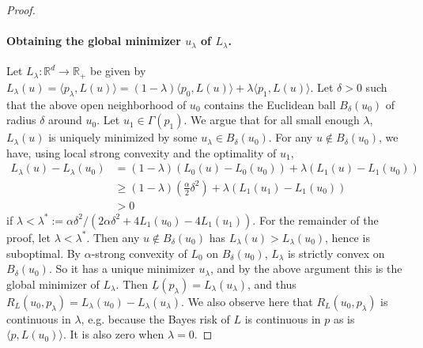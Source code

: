 \documentclass{article}
\theoremstyle{definition}\newtheorem{definition}{Definition}
\theoremstyle{definition}\newtheorem{assumption}{Assumption}
\newcommand{\reals}{\mathbb{R}}
\newcommand{\risk}[1]{\underline{#1}}
\newcommand{\inprod}[2]{\langle #1, #2 \rangle}%
\begin{document}
\begin{proof}
  \paragraph{Obtaining the global minimizer $u_{\lambda}$ of $L_{\lambda}$.}
  Let $L_\lambda:\reals^d\to\reals_+$ be given by $L_\lambda(u) = \inprod{p_\lambda}{L(u)} = (1-\lambda) \inprod{p_0}{L(u)} + \lambda \inprod{p_1}{L(u)}$.
  Let $\delta >0$ such that the above open neighborhood of $u_0$ contains the Euclidean ball $B_\delta(u_0)$ of radius $\delta$ around $u_0$.
  Let $u_1 \in \Gamma(p_1)$.
  We argue that for all small enough $\lambda$, $L_{\lambda}(u)$ is uniquely minimized by some $u_{\lambda} \in B_{\delta}(u_0)$.
  For any $u\notin B_\delta(u_0)$, we have, using local strong convexity and the optimality of $u_1$,
  \begin{align*}
    L_\lambda(u) - L_\lambda(u_0)
    &=
      (1-\lambda) \left( L_0(u) - L_0(u_0) \right)
      + \lambda \left( L_1(u) - L_1(u_0) \right)
    \\
    &\geq
      (1-\lambda) \left( \frac \alpha 2 \delta^2 \right)
      + \lambda \left( L_1(u_1) - L_1(u_0) \right)~  \\
    &> 0
  \end{align*}
  if $\lambda < \lambda^* := \alpha \delta^2 / (2 \alpha \delta^2 + 4 L_1(u_0) - 4 L_1(u_1))$.
  For the remainder of the proof, let $\lambda < \lambda^*$.
  Then any $u\notin B_{\delta}(u_0)$ has $L_{\lambda}(u) > L_{\lambda}(u_0)$, hence is suboptimal.
  By $\alpha$-strong convexity of $L_0$ on $B_\delta(u_0)$, $L_\lambda$ is strictly convex on $B_\delta(u_0)$.
  So it has a unique minimizer $u_{\lambda}$, and by the above argument this is the global minimizer of $L_{\lambda}$.
  Then $\risk{L}(p_\lambda) = L_\lambda(u_\lambda)$, and thus $R_L(u_0,p_\lambda) = L_\lambda(u_0) - L_\lambda(u_\lambda)$.
  We also observe here that $R_L(u_0,p_{\lambda})$ is continuous in $\lambda$, e.g. because the Bayes risk of $L$ is continuous in $p$ as is $\inprod{p}{L(u_0)}$.
  It is also zero when $\lambda = 0$.


\end{proof}
\end{document}
